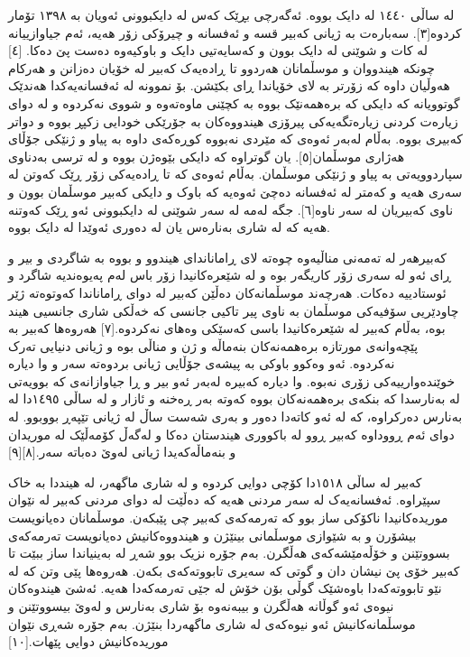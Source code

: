 \documentclass[a4paper]{article}
\begin{document}
\begin{flushright}
لە ساڵی ١٤٤٠ لە دایک بووە. ئەگەرچی بڕێک کەس لە دایکبوونی ئەویان بە ١٣٩٨ تۆمار کردوە[٣]. سەبارەت بە ژیانی کەبیر قسە و ئەفسانە و چیرۆکی زۆر ھەیە، ئەم جیاوازییانە لە کات و شوێنی لە دایک بوون و کەسایەتیی دایک و باوکیەوە دەست پێ دەکا. [٤] چونکە ھیندووان و موسڵمانان ھەردوو تا ڕادەیەک کەبیر لە خۆیان دەزانن و ھەرکام ھەوڵیان داوە کە زۆرتر بە لای خۆیاندا ڕای بکێشن. بۆ نموونە لە ئەفسانەیەکدا ھەندێک گوتوویانە کە دایکی کە برەھمەنێک بووە بە کچێنی ماوەتەوە و شووی نەکردوە و لە دوای زیارەت کردنی زیارەتگەیەکی پیرۆزی ھیندووەکان بە جۆرێکی خودایی زکپڕ بووە و دواتر کەبیری بووە. بەڵام لەبەر ئەوەی کە مێردی نەبووە کوڕەکەی داوە بە پیاو و ژنێکی جۆڵای ھەژاری موسڵمان[٥]. یان گوتراوە کە دایکی بێوەژن بووە و لە ترسی بەدناوی سپاردوویەتی بە پیاو و ژنێکی موسڵمان. بەڵام ئەوەی کە تا ڕادەیەکی زۆر ڕێک کەوتن لە سەری ھەیە و کەمتر لە ئەفسانە دەچێ ئەوەیە کە باوک و دایکی کەبیر موسڵمان بوون و ناوی کەبیریان لە سەر ناوە[٦]. جگە لەمە لە سەر شوێنی لە دایکبوونی ئەو ڕێک کەوتنە هەیە کە لە شاری بەنارەس یان لە دەوری ئەوێدا لە دایک بووە.

کەبیرھەر لە تەمەنی مناڵیەوە چوەتە لای ڕاماناندای ھیندوو و بووە بە شاگردی و بیر و ڕای ئەو لە سەری زۆر کاریگەر بوە و لە شێعرەکانیدا زۆر باس لەم پەیوەندیە شاگرد و ئوستادییە دەکات. ھەرچەند موسڵمانەکان دەڵێن کەبیر لە دوای ڕاماناندا کەوتوەتە ژێر چاودێریی سۆفیەکی موسڵمان بە ناوی پیر تاکیی جانسی کە خەڵکی شاری جانسیی ھیند بوە، بەڵام کەبیر لە شێعرەکانیدا باسی کەسێکی وەھای نەکردوە.[٧] ھەروەھا کەبیر بە پێچەوانەی مورتازە برەھمەنەکان بنەماڵە و ژن و مناڵی بوە و ژیانی دنیایی تەرک نەکردوە. ئەو وەکوو باوکی بە پیشەی جۆڵایی ژیانی بردوەتە سەر و وا دیارە خوێندەوارییەکی زۆری نەبوە. وا دیارە کەبیرە لەبەر ئەو بیر و ڕا جیاوازانەی کە بوویەتی لە بەنارسدا کە بنکەی برەھمەنەکان بووە کەوتە بەر ڕەخنە و ئازار و لە ساڵی ١٤٩٥دا لە بەنارس دەرکراوە، کە لە ئەو کاتەدا دەور و بەری شەست ساڵ لە ژیانی تێپەڕ بووبوو. لە دوای ئەم ڕووداوە کەبیر ڕوو لە باکووری ھیندستان دەکا و لەگەڵ کۆمەڵێک لە موریدان و بنەماڵەکەیدا ژیانی لەوێ دەباتە سەر.[٨][٩]

کەبیر لە ساڵی ١٥١٨دا کۆچی دوایی کردوە و لە شاری ماگھەر، لە ھینددا بە خاک سپێراوە. ئەفسانەیەک لە سەر مردنی ھەیە کە دەڵێت لە دوای مردنی کەبیر لە نێوان موریدەکانیدا ناکۆکی ساز بوو کە تەرمەکەی کەبیر چی پێبکەن. موسڵمانان دەیانویست بیشۆرن و بە شێوازی موسڵمانی بینێژن و ھیندووەکانیش دەیانویست تەرمەکەی بسووتێنن و خۆڵەمێشەکەی ھەڵگرن. بەم جۆرە نزیک بوو شەڕ لە بەینیاندا ساز ببێت تا کەبیر خۆی پێ نیشان دان و گوتی کە سەیری تابووتەکەی بکەن. ھەروەھا پێی وتن کە لە نێو تابووتەکەدا باوەشێک گوڵی بۆن خۆش لە جێی تەرمەکەدا ھەیە. ئەشێ ھیندوەکان نیوەی ئەو گوڵانە ھەڵگرن و بیبەنەوە بۆ شاری بەنارس و لەوێ بیسووتێنن و موسڵمانەکانیش ئەو نیوەکەی لە شاری ماگھەردا بنێژن. بەم جۆرە شەڕی نێوان موریدەکانیش دوایی پێھات.[١٠]


\end{flushright}
\end{document}
